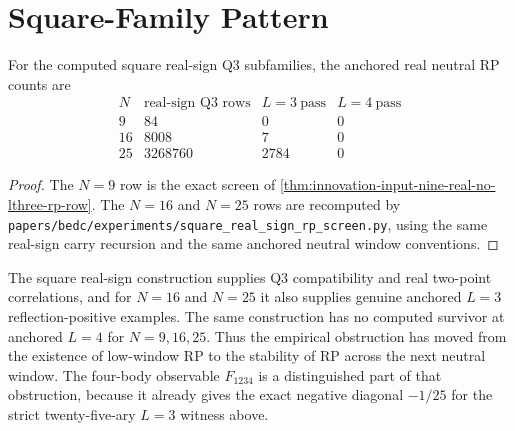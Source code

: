 \section{Square-Family Pattern}
\label{sec:innovation-input-square-family-pattern}

\begin{theorem}
\label{thm:innovation-input-square-real-sign-bottleneck}
For the computed square real-sign Q3 subfamilies, the anchored real
neutral RP counts are
$$
\begin{array}{c|r|r|r}
N & \text{real-sign Q3 rows} & L=3\ \text{pass} & L=4\ \text{pass}\\
\hline
9 & 84 & 0 & 0\\
16 & 8008 & 7 & 0\\
25 & 3268760 & 2784 & 0
\end{array}
$$
\end{theorem}

\begin{proof}
The $N=9$ row is the exact screen of
\autoref{thm:innovation-input-nine-real-no-lthree-rp-row}. The
$N=16$ and $N=25$ rows are recomputed by
\texttt{papers/bedc/experiments/square\_real\_sign\_rp\_screen.py}, using
the same real-sign carry recursion and the same anchored neutral window
conventions.
\end{proof}

\begin{principle}
\label{prin:innovation-input-square-real-sign-local-not-stable-rp}
The square real-sign construction supplies Q3 compatibility and real
two-point correlations, and for $N=16$ and $N=25$ it also supplies genuine
anchored $L=3$ reflection-positive examples. The same construction has no
computed survivor at anchored $L=4$ for $N=9,16,25$. Thus the empirical
obstruction has moved from the existence of low-window RP to the stability
of RP across the next neutral window. The four-body observable
$F_{1234}$ is a distinguished part of that obstruction, because it already
gives the exact negative diagonal $-1/25$ for the strict twenty-five-ary
$L=3$ witness above.
\end{principle}
